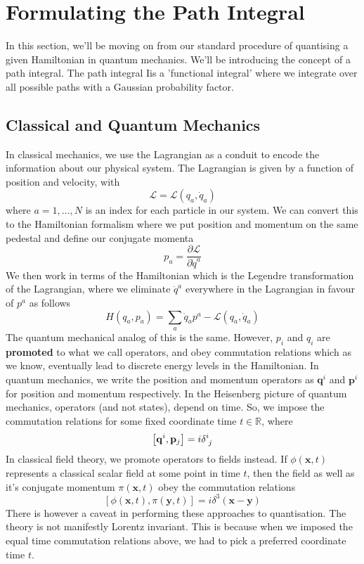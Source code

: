 \documentclass[11pt, oneside]{article}   	%
\theoremstyle{slanted}
\let\vec\mathbf
\begin{document}
\section{Formulating the Path Integral} 

In this section, we'll be moving on from 
our standard procedure of quantising a given Hamiltonian 
in quantum mechanics. We'll be introducing 
the concept of a path integral. The path integral 
Iis a 'functional integral' where we integrate over 
all possible paths with a Gaussian probability factor.

\subsection{Classical and Quantum Mechanics}
In classical mechanics, we use the Lagrangian 
as a conduit to encode the information about our 
physical system. The Lagrangian is given by a function 
of position and velocity, with 
\[
	\mathcal{ L }  = \mathcal{ L } \left( q _ a , \dot {q} _ a  \right) 
\] where $ a = 1 , \dots  , N $ is an index for each particle 
in our system. We can convert this to the Hamiltonian formalism 
where we put position and momentum on the same pedestal and 
define our conjugate momenta
\[
 p _ a = \frac{\partial  \mathcal{ L }}{\partial  \dot{q } ^ a  } 
\] We then work in terms of the Hamiltonian 
which is the Legendre transformation of the 
Lagrangian, where we eliminate $ \dot{ q }^ a   $
everywhere in the Lagrangian in favour of $ p^ a$ as follows 
\[
	H ( q_a , p _ a  ) = \sum _{ a } \dot{ q }_ a p ^ a  - \mathcal{ L } \left( q _ a , \dot{ q } _ a  \right)   
\] 
The quantum mechanical analog of this is the same. 
However, $ p_ i $ and $ q _ i $ are \textbf{promoted} to 
what we call operators, and obey commutation relations 
which as we know, eventually lead to discrete energy levels 
in the Hamiltonian. In quantum mechanics,
we write the position and momentum operators 
as $ \vec{q}^ i  $ and $ \vec{p} ^ i $ for position  
and momentum respectively. 
In the Heisenberg picture of quantum mechanics, 
operators (and not states), depend on time. 
So, we impose the commutation relations 
for some fixed coordinate time $ t \in \mathbb{ R } $, where 
\[
 \left[  \vec{q}^ i , \vec{p} _ j  \right]   = i  \delta \indices{ ^ i _ j }  
\]  
In classical field theory, we 
promote operators 
to fields instead. If $ \phi ( \vec{x} , t ) $  
represents a classical scalar field at some point in time $ t $, 
then the field as well as it's conjugate momentum $ \pi \left( \vec{x}, t   \right) $ 
obey the commutation relations
\[
	\left[  \phi ( \vec{x},  t ) , \pi ( \vec{y}, t  )  \right]  
	= i \delta ^ 3 \left( \vec{x} - \vec{y} \right) 
\] There is however a caveat in performing these 
approaches to quantisation. 
The theory is not manifestly Lorentz invariant. This is because 
when we imposed the equal time commutation 
relations above, we had to pick a preferred coordinate 
time $ t $. 
\end{document}
